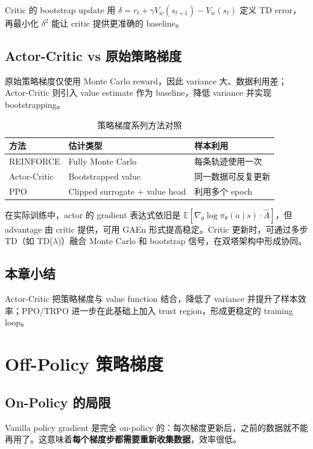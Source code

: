 \documentclass[a4paper]{article}
\begin{document}
Critic 的 bootstrap update 用 $\delta = r_t + \gamma V_w(s_{t+1}) - V_w(s_t)$ 定义 TD error，再最小化 $\delta^2$ 能让 critic 提供更准确的 baseline。

\subsection{Actor-Critic vs 原始策略梯度}
原始策略梯度仅使用 Monte Carlo reward，因此 variance 大、数据利用差；Actor-Critic 则引入 value estimate 作为 baseline，降低 variance 并实现 bootstrapping。
\begin{table}[H]
\centering
\small
\begin{tabular}{p{}p{}p{}}
\toprule
方法 & 估计类型 & 样本利用 \\
\midrule
REINFORCE & Fully Monte Carlo & 每条轨迹使用一次 \\
Actor-Critic & Bootstrapped value & 同一数据可反复更新 \\
PPO & Clipped surrogate + value head & 利用多个 epoch \\
\bottomrule
\end{tabular}
\caption{策略梯度系列方法对照}
\end{table}

在实际训练中，actor 的 gradient 表达式依旧是 $\mathbb{E}[\nabla_\theta \log \pi_\theta(a\mid s) \cdot \hat{A}]$，但 advantage 由 critic 提供，可用 GAEn 形式提高稳定。Critic 更新时，可通过多步 TD（如 TD($\lambda$)）融合 Monte Carlo 和 bootstrap 信号，在双塔架构中形成协同。

\subsection{本章小结}
Actor-Critic 把策略梯度与 value function 结合，降低了 variance 并提升了样本效率；PPO/TRPO 进一步在此基础上加入 trust region，形成更稳定的 training loop。

\section{Off-Policy 策略梯度}

\subsection{On-Policy 的局限}

Vanilla policy gradient 是完全 on-policy 的：每次梯度更新后，之前的数据就不能再用了。这意味着\textbf{每个梯度步都需要重新收集数据}，效率很低。
\end{document}
